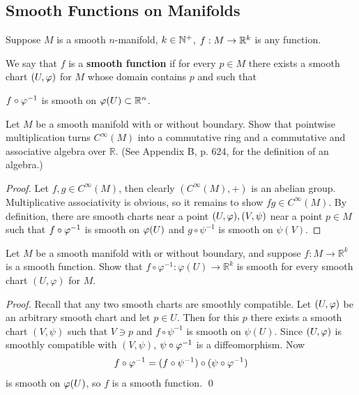\subsection{Smooth Functions on Manifolds}
Suppose $M$ is a smooth $n$-manifold, $k \in \mathbb{N}^+$, $f:M \to \mathbb{R}^k$ is any function. \begin{definition}
    We say that $f$ is a \textbf{smooth function} if for every $p \in M$ there exists a smooth chart $(U, \varphi)$ for $M$ whose domain contains $p$ and such that 
    \begin{center}
        $f \circ \varphi^{-1}$ is smooth on $\varphi(U) \subset \mathbb{R}^n$. 
    \end{center}
\end{definition}
\begin{exercise}
    Let $M$ be a smooth manifold with or without boundary. Show that pointwise multiplication turns $C^{\infty}(M)$ into a commutative ring and a commutative and associative algebra over $\mathbb{R}$. (See Appendix B, p. 624, for the definition of an algebra.)
\end{exercise}
\begin{proof}
    Let $f,g \in C^\infty(M)$, then clearly $(C^\infty(M), +)$ is an abelian group. Multiplicative associativity is obvious, so it remains to show $fg \in C^\infty(M)$. By definition, there are smooth charts near a point $(U, \varphi), (V, \psi)$ near a point $p \in M$ such that 
    $f \circ \varphi^{-1}$ is smooth on $\varphi(U)$ and $g \circ \psi^{-1}$ is smooth on $\psi(V)$. 
\end{proof}
\begin{exercise}
    Let $M$ be a smooth manifold with or without boundary, and suppose $f: M \rightarrow \mathbb{R}^k$ is a smooth function. Show that $f \circ \varphi^{-1}: \varphi(U) \rightarrow \mathbb{R}^k$ is smooth for every smooth chart $(U, \varphi)$ for $M$.
\end{exercise}
\begin{proof}
    Recall that any two smooth charts are smoothly compatible. 
    Let $(U,\varphi)$ be an arbitrary smooth chart and let $p \in U$. Then for this $p$ there exists a smooth chart $(V,\psi)$ such that $V \ni p$ and $f \circ \psi^{-1}$ is smooth on $\psi(U)$. Since $(U,\varphi)$ is smoothly compatible with $(V,\psi)$, 
    $\psi \circ \varphi^{-1}$ is a diffeomorphism. Now
    $$f \circ \varphi^{-1} = (f \circ \psi^{-1}) \circ (\psi \circ \varphi^{-1}) $$
    is smooth on $\varphi(U)$, so $f$ is a smooth function. \qed 
\end{proof}

